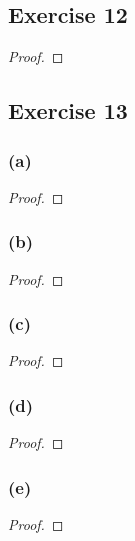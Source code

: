 \documentclass[14pt]{extarticle}
\begin{document}
\subsection{Exercise 12}

\begin{proof}

\end{proof}

\subsection{Exercise 13}

\subsubsection{(a)}

\begin{proof}

\end{proof}

\subsubsection{(b)}

\begin{proof}

\end{proof}

\subsubsection{(c)}

\begin{proof}

\end{proof}

\subsubsection{(d)}

\begin{proof}

\end{proof}

\subsubsection{(e)}

\begin{proof}

\end{proof}
\end{document}
